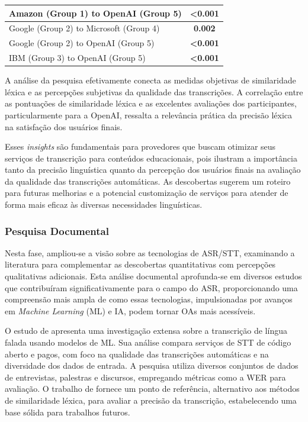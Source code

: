 \begin{table}[htb]
\begin{tabular}{|lcccc|}
\multicolumn{3}{|l|}{Amazon (Group 1) to OpenAI (Group 5)} & \multicolumn{2}{c|}{\textbf{\textless 0.001}} \\ \hline
\multicolumn{3}{|l|}{Google (Group 2) to Microsoft (Group 4)} & \multicolumn{2}{c|}{\textbf{0.002}} \\ \hline
\multicolumn{3}{|l|}{Google (Group 2) to OpenAI (Group 5)} & \multicolumn{2}{c|}{\textbf{\textless 0.001}} \\ \hline
\multicolumn{3}{|l|}{IBM (Group 3) to OpenAI (Group 5)} & \multicolumn{2}{c|}{\textbf{\textless 0.001}} \\ \hline
\end{tabular}
\end{table}

A análise da pesquisa efetivamente conecta as medidas objetivas de similaridade léxica e as percepções subjetivas da qualidade das transcrições. A correlação entre as pontuações de similaridade léxica e as excelentes avaliações dos participantes, particularmente para a OpenAI, ressalta a relevância prática da precisão léxica na satisfação dos usuários finais. 

Esses \textit{insights} são fundamentais para provedores que buscam otimizar seus serviços de transcrição para conteúdos educacionais, pois ilustram a importância tanto da precisão linguística quanto da percepção dos usuários finais na avaliação da qualidade das transcrições automáticas. As descobertas sugerem um roteiro para futuras melhorias e a potencial customização de serviços para atender de forma mais eficaz às diversas necessidades linguísticas.

\subsubsection{Pesquisa Documental}

Nesta fase, ampliou-se a visão sobre as tecnologias de ASR/STT, examinando a literatura para complementar as descobertas quantitativas com percepções qualitativas adicionais. Esta análise documental aprofunda-se em diversos estudos que contribuíram significativamente para o campo do ASR, proporcionando uma compreensão mais ampla de como essas tecnologias, impulsionadas por avanços em \textit{Machine Learning} (ML) e IA, podem tornar OAs mais acessíveis.

O estudo de  apresenta uma investigação extensa sobre a transcrição de língua falada usando modelos de ML. Sua análise compara serviços de STT de código aberto e pagos, com foco na qualidade das transcrições automáticas e na diversidade dos dados de entrada. A pesquisa utiliza diversos conjuntos de dados de entrevistas, palestras e discursos, empregando métricas como a WER para avaliação. O trabalho de  fornece um ponto de referência, alternativo aos métodos de similaridade léxica, para avaliar a precisão da transcrição, estabelecendo uma base sólida para trabalhos futuros.

